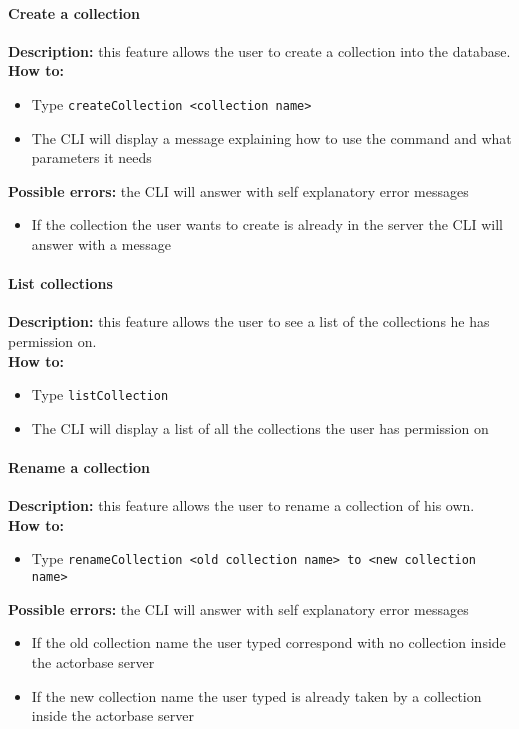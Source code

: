 \documentclass{scalatekids-article}
\begin{document}
\paragraph{Create a collection}
\label{sec:createcollection}
\textbf{Description:} this feature allows the user to create a 
collection into the database.\\
\textbf{How to:} 
\begin{itemize}
	\item Type \texttt{createCollection <collection name>}
	\item The CLI will display a message explaining how to use the command and what parameters it needs
\end{itemize}
\textbf{Possible errors:} the CLI will answer with self explanatory error messages 
\begin{itemize}
	\item If the collection the user wants to create is already in the server the CLI will answer with a message
\end{itemize}

\paragraph{List collections}
\label{sec:listcollection}
\textbf{Description:} this feature allows the user to see a list of 
the collections he has permission on.\\
\textbf{How to:} 
\begin{itemize}
	\item Type \texttt{listCollection}
	\item The CLI will display a list of all the collections the user has 
	permission on
\end{itemize}

\paragraph{Rename a collection}
\label{sec:renamecollection}
\textbf{Description:} this feature allows the user to rename a 
collection of his own.\\
\textbf{How to:} 
\begin{itemize}
	\item Type \texttt{renameCollection <old collection name> to <new collection name>}
\end{itemize}
\textbf{Possible errors:} the CLI will answer with self explanatory error messages 
\begin{itemize}
	\item If the old collection name the user typed correspond with no collection inside the actorbase server
	\item If the new collection name the user typed is already taken by a collection inside the actorbase server 
\end{itemize}
\end{document}
